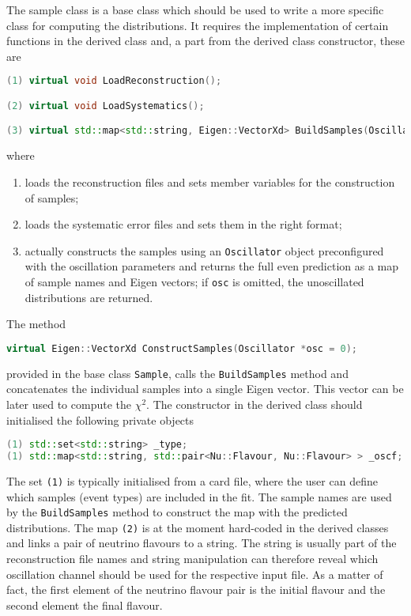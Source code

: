 \documentclass[a4paper, 11pt]{article}
\begin{document}
The sample class is a base class which should be used to write a more specific class for computing the distributions.
It requires the implementation of certain functions in the derived class and, a part from the derived class constructor, these are
\begin{lstlisting}[language=C++]
(1) virtual void LoadReconstruction();

(2) virtual void LoadSystematics();

(3) virtual std::map<std::string, Eigen::VectorXd> BuildSamples(Oscillator *osc = 0);
\end{lstlisting}
where
\begin{enumerate}
	\item loads the reconstruction files and sets member variables for the construction of samples;
	\item loads the systematic error files and sets them in the right format;
	\item actually constructs the samples using an \texttt{Oscillator} object preconfigured with the oscillation parameters %
		and returns the full even prediction as a map of sample names and Eigen vectors; if \texttt{osc} is omitted, %
		the unoscillated distributions are returned.
\end{enumerate}
The method 
\begin{lstlisting}[language=C++]
    virtual Eigen::VectorXd ConstructSamples(Oscillator *osc = 0);
\end{lstlisting}
provided in the base class \texttt{Sample}, calls the \texttt{BuildSamples} method and concatenates the individual samples %
into a single Eigen vector.
This vector can be later used to compute the $\chi^2$.
The constructor in the derived class should initialised the following private objects 
\begin{lstlisting}[language=C++]
(1) std::set<std::string> _type;
(1) std::map<std::string, std::pair<Nu::Flavour, Nu::Flavour> > _oscf;
\end{lstlisting}
The set \texttt{(1)} is typically initialised from a card file, where the user can define which samples (event types) are included in the fit.
The sample names are used by the \texttt{BuildSamples} method to construct the map with the predicted distributions.
The map \texttt{(2)} is at the moment hard-coded in the derived classes and links a pair of neutrino flavours to a string.
The string is usually part of the reconstruction file names and string manipulation can therefore reveal which %
oscillation channel should be used for the respective input file.
As a matter of fact, the first element of the neutrino flavour pair is the initial flavour and the second element the final flavour.
\end{document}
